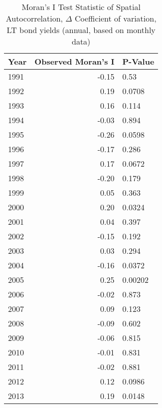 \begin{table}[ht]
\centering
\caption{Moran's I Test Statistic of Spatial Autocorrelation, $\Delta$ Coefficient of variation, LT bond yields (annual, based on monthly data)} 
\label{moransIVolatility}
\begingroup\tiny
\begin{tabular}{lrl}
  \hline
Year & Observed Moran's I & P-Value \\ 
  \hline
1991 & -0.15 & 0.53 \\ 
  1992 & 0.19 & 0.0708 \\ 
  1993 & 0.16 & 0.114 \\ 
  1994 & -0.03 & 0.894 \\ 
  1995 & -0.26 & 0.0598 \\ 
  1996 & -0.17 & 0.286 \\ 
  1997 & 0.17 & 0.0672 \\ 
  1998 & -0.20 & 0.179 \\ 
  1999 & 0.05 & 0.363 \\ 
  2000 & 0.20 & 0.0324 \\ 
  2001 & 0.04 & 0.397 \\ 
  2002 & -0.15 & 0.192 \\ 
  2003 & 0.03 & 0.294 \\ 
  2004 & -0.16 & 0.0372 \\ 
  2005 & 0.25 & 0.00202 \\ 
  2006 & -0.02 & 0.873 \\ 
  2007 & 0.09 & 0.123 \\ 
  2008 & -0.09 & 0.602 \\ 
  2009 & -0.06 & 0.815 \\ 
  2010 & -0.01 & 0.831 \\ 
  2011 & -0.02 & 0.881 \\ 
  2012 & 0.12 & 0.0986 \\ 
  2013 & 0.19 & 0.0148 \\ 
   \hline
\end{tabular}
\endgroup
\end{table}
